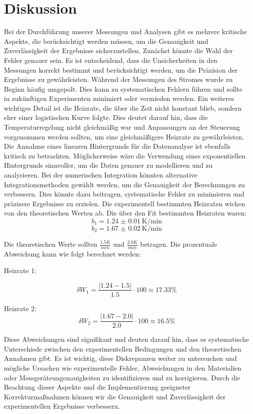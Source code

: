 \section{Diskussion}
\label{sec:Diskussion}
Bei der Durchführung unserer Messungen und Analysen gibt es mehrere kritische Aspekte, 
die berücksichtigt werden müssen, um die Genauigkeit und Zuverlässigkeit der Ergebnisse sicherzustellen.
Zunächst könnte die Wahl der Fehler genauer sein. Es ist entscheidend, dass die Unsicherheiten
in den Messungen korrekt bestimmt und berücksichtigt werden, um die Präzision der Ergebnisse zu gewährleisten.
Während der Messungen des Stromes wurde zu Beginn häufig umgepolt. Dies kann zu systematischen Fehlern führen 
und sollte in zukünftigen Experimenten minimiert oder vermieden werden.
Ein weiteres wichtiges Detail ist die Heizrate, die über die Zeit nicht konstant blieb, sondern eher einer logistischen Kurve folgte.
Dies deutet darauf hin, dass die Temperaturregelung nicht gleichmäßig war und Anpassungen an der Steuerung vorgenommen werden sollten, 
um eine gleichmäßigere Heizrate zu gewährleisten. Die Annahme eines linearen Hintergrunds für die Datenanalyse ist ebenfalls
kritisch zu betrachten. Möglicherweise wäre die Verwendung eines exponentiellen Hintergrunds sinnvoller, um die Daten genauer zu 
modellieren und zu analysieren. Bei der numerischen Integration könnten alternative Integrationsmethoden gewählt werden, um die
Genauigkeit der Berechnungen zu verbessern. Dies könnte dazu beitragen, systematische Fehler zu minimieren und präzisere Ergebnisse zu erzielen.
Die experimentell bestimmten Heizraten wichen von den theoretischen Werten ab. Die über den Fit bestimmten Heizraten waren:
\begin{equation}
b_1 =  \qty{1.24(1)}{\kelvin\per\minute}
\end{equation}
\begin{equation}
b_2 = \qty{1.67(2)}{\kelvin\per\minute}
\end{equation}

Die theoretischen Werte sollten $\frac{1.5 K}{min}$ und $\frac{2.0 K}{min}$ betragen.
Die prozentuale Abweichung kann wie folgt berechnet werden:

Heizrate 1:

\begin{equation}
    \delta W_1= \frac{|1.24 - 1.5|}{1.5} \cdot100 \approx17.33\%
\end{equation}

Heizrate 2:
\begin{equation}
    \delta W_2= \frac{|1.67 - 2.0|}{2.0} \cdot100 \approx16.5\%
\end{equation}

Diese Abweichungen sind signifikant und deuten darauf hin, dass es systematische Unterschiede zwischen den experimentellen 
Bedingungen und den theoretischen Annahmen gibt. Es ist wichtig, diese Diskrepanzen weiter zu untersuchen und mögliche 
Ursachen wie experimentelle Fehler, Abweichungen in den Materialien oder Messgeräteungenauigkeiten zu identifizieren und zu korrigieren.
Durch die Beachtung dieser Aspekte und die Implementierung geeigneter Korrekturmaßnahmen können wir die Genauigkeit und
Zuverlässigkeit der experimentellen Ergebnisse verbessern.